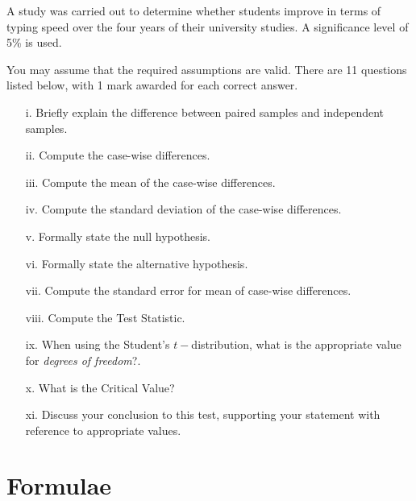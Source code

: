 \documentclass[a4paper,12pt]{article}
\begin{document}
A study was carried out to determine whether students improve in terms of typing speed over the four years of their university studies. A significance level of 5\% is used. \\
\bigskip


\noindent You may assume that the required assumptions are valid. There are 11 questions listed below, with 1 mark awarded for each correct answer.
\begin{itemize}
\item[i.] Briefly explain the difference between paired samples and independent samples.
\item[ii.] Compute the case-wise differences.
\item[iii.] Compute the mean of the case-wise differences.
\item[iv.] Compute the standard deviation of the case-wise differences.
\item[v.] Formally state the null hypothesis.
\item[vi.] Formally state the alternative hypothesis.
\item[vii.] Compute the standard error for mean of case-wise differences.
\item[viii.] Compute the Test Statistic.
\item[ix.] When using the Student's $t-$distribution, what is the appropriate value for \textit{degrees of freedom}?.
\item[x.] What is the Critical Value?
\item[xi.] Discuss your conclusion to this test, supporting your statement with reference to appropriate values.
\end{itemize}


%

\newpage


\section*{Formulae}
\end{document}
